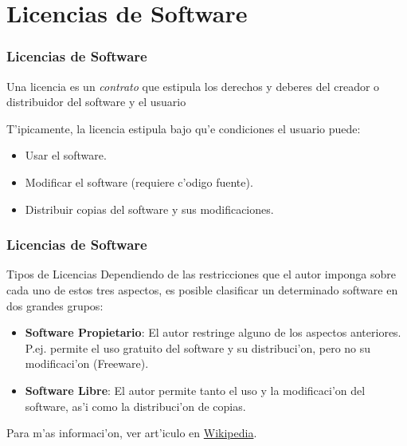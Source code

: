 \documentclass{beamer}
\begin{document}
\section{Licencias de Software}
\begin{frame}[fragile]\frametitle{Licencias de Software}
\begin{block}{}
Una licencia es un \textit{contrato} que estipula los derechos y deberes del creador o distribuidor del software y el usuario
\end{block}
\begin{block}{}
T'ipicamente, la licencia estipula bajo qu'e condiciones el usuario puede:
\begin{itemize}
\item Usar el software.
\item Modificar el software (requiere c'odigo fuente).
\item Distribuir copias del software y sus modificaciones.
\end{itemize}
\end{block}
\end{frame}

\begin{frame}
\frametitle{Licencias de Software}
\begin{block}{Tipos de Licencias}
Dependiendo de las restricciones que el autor imponga sobre cada uno de estos tres aspectos, es posible clasificar un determinado software en dos grandes grupos:
\begin{itemize}
\item \textbf{Software Propietario}: El autor restringe alguno de los aspectos anteriores. P.ej. permite el uso gratuito del software y su distribuci'on, pero no su modificaci'on (Freeware).
\item \textbf{Software Libre}: El autor permite tanto el uso y la modificaci'on del software, as'i como la distribuci'on de copias.
\end{itemize}
\end{block}
Para m'as informaci'on, ver art'iculo en \href{https://es.wikipedia.org/wiki/Licencia_de_software}{Wikipedia}.
\end{frame}
\end{document}
